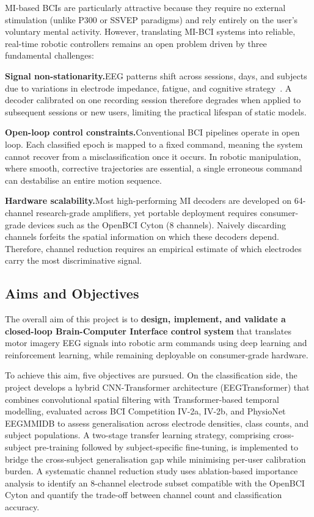 \documentclass[12pt, a4paper]{article}
\begin{document}
MI-based BCIs are particularly attractive because they require no external stimulation (unlike P300 or SSVEP paradigms) and rely entirely on the user's voluntary mental activity. However, translating MI-BCI systems into reliable, real-time robotic controllers remains an open problem driven by three fundamental challenges:

\textbf{Signal non-stationarity.}\quad EEG patterns shift across sessions, days, and subjects due to variations in electrode impedance, fatigue, and cognitive strategy~\cite{hameed2025enhancing}. A decoder calibrated on one recording session therefore degrades when applied to subsequent sessions or new users, limiting the practical lifespan of static models.

\textbf{Open-loop control constraints.}\quad Conventional BCI pipelines operate in open loop. Each classified epoch is mapped to a fixed command, meaning the system cannot recover from a misclassification once it occurs. In robotic manipulation, where smooth, corrective trajectories are essential, a single erroneous command can destabilise an entire motion sequence.

\textbf{Hardware scalability.}\quad Most high-performing MI decoders are developed on 64-channel research-grade amplifiers, yet portable deployment requires consumer-grade devices such as the OpenBCI Cyton (8 channels). Naively discarding channels forfeits the spatial information on which these decoders depend. Therefore, channel reduction requires an empirical estimate of which electrodes carry the most discriminative signal.

\subsection{Aims and Objectives}

The overall aim of this project is to \textbf{design, implement, and validate a closed-loop Brain-Computer Interface control system} that translates motor imagery EEG signals into robotic arm commands using deep learning and reinforcement learning, while remaining deployable on consumer-grade hardware.

To achieve this aim, five objectives are pursued. On the classification side, the project develops a hybrid CNN-Transformer architecture (EEGTransformer) that combines convolutional spatial filtering with Transformer-based temporal modelling, evaluated across BCI Competition IV-2a, IV-2b, and PhysioNet EEGMMIDB to assess generalisation across electrode densities, class counts, and subject populations. A two-stage transfer learning strategy, comprising cross-subject pre-training followed by subject-specific fine-tuning, is implemented to bridge the cross-subject generalisation gap while minimising per-user calibration burden. A systematic channel reduction study uses ablation-based importance analysis to identify an 8-channel electrode subset compatible with the OpenBCI Cyton and quantify the trade-off between channel count and classification accuracy.
\end{document}
